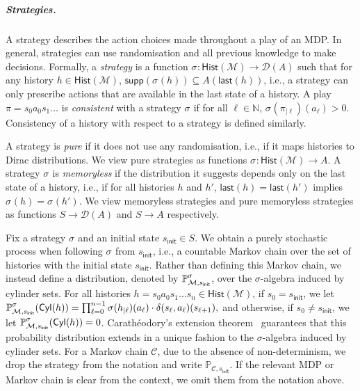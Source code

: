 \documentclass[a4paper,UKenglish,cleveref,autoref,thm-restate,colorlinks]{lipics-v2021}
\newcommand{\init}{\mathsf{init}}
\newcommand{\IN}{\mathbb{N}}
\newcommand{\proba}{\mathbb{P}}
\newcommand{\dist}[1]{\mathcal{D}(#1)}
\newcommand{\cyl}[1]{\mathsf{Cyl}(#1)}
\newcommand{\supp}[1]{\mathsf{supp}(#1)}
\newcommand{\mdp}{\mathcal{M}}
\newcommand{\mdpStateSpace}{S}
\newcommand{\mdpState}{s}
\newcommand{\mdpActionSpace}{A}
\newcommand{\mdpAction}{a}
\newcommand{\mdpTrans}{\delta}
\newcommand{\play}{\pi}
\newcommand{\playPrefix}[2]{#1_{|#2}}
\newcommand{\histSet}[1]{\mathsf{Hist}(#1)}
\newcommand{\hist}{h}
\newcommand{\last}[1]{\mathsf{last}(#1)}
\newcommand{\indexPosition}{\ell}
\newcommand{\indexLast}{n}
\newcommand{\mchain}{\mathcal{C}}
\newcommand{\stratGeneric}[1]{{\sigma_{#1}}}
\newcommand{\strat}{\stratGeneric{}}
\begin{document}
\subparagraph*{Strategies.}
A strategy describes the action choices made throughout a play of an MDP.
In general, strategies can use randomisation and all previous knowledge to make decisions.
Formally, a \textit{strategy} is a function $\strat\colon\histSet{\mdp}\to\dist{\mdpActionSpace}$ such that for any history $\hist\in\histSet{\mdp}$, $\supp{\strat{}(\hist)}\subseteq \mdpActionSpace(\last{\hist})$, i.e., a strategy can only prescribe actions that are available in the last state of a history.
A play $\play=\mdpState_0\mdpAction_0\mdpState_1\ldots$ is \textit{consistent} with a strategy $\strat$ if for all $\indexPosition\in\IN$, $\strat(\playPrefix{\play}{\indexPosition})(\mdpAction_\indexPosition)>0$.
Consistency of a history with respect to a strategy is defined similarly.

A strategy is \textit{pure} if it does not use any randomisation, i.e., if it maps histories to Dirac distributions.
We view pure strategies as functions $\strat{}\colon\histSet{\mdp}\to\mdpActionSpace$.
A strategy $\strat$ is \textit{memoryless} if the distribution it suggests depends only on the last state of a history, i.e., if for all histories $\hist$ and $\hist'$, $\last{\hist} = \last{\hist'}$ implies $\strat{}(\hist) = \strat{}(\hist')$.
We view memoryless strategies and pure memoryless strategies as functions $\mdpStateSpace\to \dist{\mdpActionSpace}$ and $\mdpStateSpace\to\mdpActionSpace$ respectively.

Fix a strategy $\strat{}$ and an initial state $\mdpState_\init\in\mdpStateSpace$.
We obtain a purely stochastic process when following $\strat{}$ from $\mdpState_\init$, i.e., a countable Markov chain over the set of histories with the initial state $\mdpState_\init$.
Rather than defining this Markov chain, we instead define a distribution, denoted by $\probaGverb{\mdp}{\mdpState_\init}{\strat}$, over the $\sigma$-algebra induced by cylinder sets.
For all histories $\hist = \mdpState_0\mdpAction_0\mdpState_1\ldots\mdpState_\indexLast\in\histSet{\mdp}$, if $\mdpState_0 = \mdpState_\init$, we let
\(\probaGverb{\mdp}{\mdpState_\init}{\strat}(\cyl{\hist}) =
  \prod_{\indexPosition= 0}^{\indexLast-1}
  \strat(\playPrefix{\hist}{\indexPosition})(\mdpAction_\indexPosition)\cdot
  \mdpTrans(\mdpState_\indexPosition, \mdpAction_\indexPosition)(\mdpState_{\indexPosition+1}),\)
and otherwise, if $\mdpState_0\neq\mdpState_\init$, we let $\probaGverb{\mdp}{\mdpState_\init}{\strat}(\cyl{\hist}) = 0$.
Carath\'{e}odory's extension theorem~\cite[Thm.~A.1.3.]{Dur19} guarantees that this probability distribution extends in a unique fashion to the $\sigma$-algebra induced by cylinder sets.
For a Markov chain $\mchain$, due to the absence of non-determinism, we drop the strategy from the notation and write $\proba_{\mchain, \mdpState_\init}$.
If the relevant MDP or Markov chain is clear from the context, we omit them from the notation above.
\end{document}
